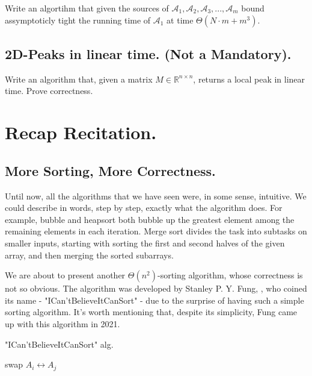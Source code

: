Write an algortihm that given the sources of $\mathcal{A}_{1},\mathcal{A}_{2},\mathcal{A}_{3},...,\mathcal{A}_{m}$ bound assymptoticly tight the running time of $\mathcal{A}_{1}$ at time $\Theta\left( N\cdot m + m^{3} \right)$. 


\subsection{2D-Peaks in linear time. (Not a Mandatory).} Write an algorithm that, given a matrix $M \in \mathbb{R}^{n\times n}$, returns a local peak in linear time. Prove correctness.

\ifdefined\SOLUTION

\fi 
\ifdefined\Book
\fi




\ifdefined\BOOK
\else
\setcounter{chapter}{4}
\fi
\section{Recap Recitation.} 



\subsection{More Sorting, More Correctness.}
Until now, all the algorithms that we have seen were, in some sense, intuitive. We could describe in words, step by step, exactly what the algorithm does. For example, bubble and heapsort both bubble up the greatest element among the remaining elements in each iteration. Merge sort divides the task into subtasks on smaller inputs, starting with sorting the first and second halves of the given array, and then merging the sorted subarrays.

We are about to present another $\Theta(n^{2})$-sorting algorithm, whose correctness is not so obvious. The algorithm was developed by Stanley P. Y. Fung, \cite{Simplesort}, who coined its name - "ICan'tBelieveItCanSort" - due to the surprise of having such a simple sorting algorithm. It's worth mentioning that, despite its simplicity, Fung came up with this algorithm in 2021.


\begin{algorithm}
\SetAlgoLined
{}
\caption{ "ICan'tBelieveItCanSort"  alg.}
 {
   {
     {
      swap $A_{i} \leftrightarrow A_{j}$
    }
  }
}


\end{algorithm}

